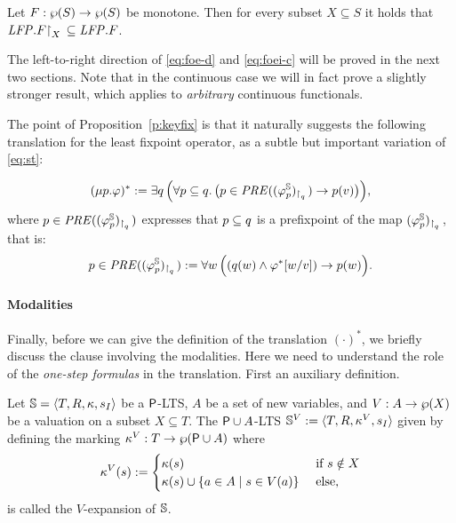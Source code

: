 \begin{proposition}
\label{p:rstfix}
Let $F:  \wp(S)\to \wp(S)$ be monotone.
Then for every subset $X \subseteq S$ it holds that $\mathit{LFP}. F{\upharpoonright}_{X}\,\subseteq 
\mathit{LFP}.F$.
\end{proposition}

The left-to-right direction of \eqref{eq:foe-d} and \eqref{eq:foei-c} 
will be proved in the next two sections.
Note that in the continuous case we will in fact prove a slightly stronger
result, which applies to \emph{arbitrary} continuous functionals.

\newcommand{\PRE}{\mathit{PRE}}
The point of Proposition~\ref{p:keyfix} is that it naturally suggests the
following translation for the least fixpoint operator, as a subtle but important 
variation of \eqref{eq:st}:

\begin{equation}
\label{eq:trlmu}
(\mu p. \varphi)^{*} \df 
   \exists q\,\Big(\forall  p \sse q.\,
      \big(p \in \PRE((\varphi^{\bbS}_{p})_{\rst{q}}) \to p(v)\big)\Big),
\end{equation}
where $p \in \PRE((\varphi^{\bbS}_{p})_{\rst{q}})$ expresses that $p \subseteq q$ 
is a prefixpoint of the map $(\varphi^{\mathbb{S}}_{p})_{{\upharpoonright}_{q}\,}$, that is:
\[
p  \in \PRE((\varphi^{\bbS}_{p})_{\rst{q}}) \df
\forall w\, \Big(
( q(w) \land \varphi^{*}[w/v]) \to p(w)
\Big).
\]

\paragraph{Modalities}
Finally, before we can give the definition of the translation $(\cdot)^{*}$, we
briefly discuss the clause involving the modalities.
Here we need to understand the role of the \emph{one-step formulas} in the 
translation.
First an auxiliary definition.

\begin{definition}\label{def:exp}
Let $\mathbb{S} = \langle{T,R,\kappa, s_I}\rangle$ be a $\mathsf{P}$-LTS, $A$ be a set of
new variables, and $V: A \to \wp(X)$ be a valuation on a subset $X\subseteq T$. 
The $\mathsf{P}\cup A$-LTS $\mathbb{S}^{V}\mathrel{:=} \langle{T,R,\kappa^V, s_I}\rangle$ given by 
defining the marking $\kappa^V: T \to \wp{(\mathsf{P}\cup A)}$ where
\[\tscolors^V(s)\isdef  
\begin{cases} \tscolors(s) & \text{ if } s \notin X \\
\tscolors(s) \cup \{ a \in A \mid s \in V(a)\}& \text{ else,}
\end{cases}\]
is called the $V$-expansion of $\mathbb{S}$.
\end{definition}

